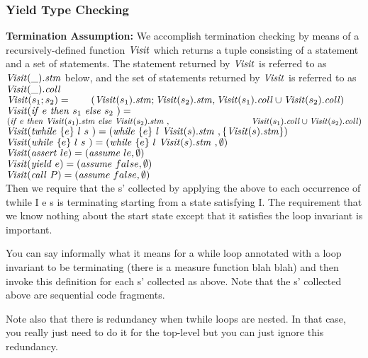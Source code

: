 \subsubsection{Yield Type Checking}

{\bf Termination Assumption:}
We accomplish termination checking by means of a recursively-defined function ${\mathit{Visit}}$ which returns a tuple consisting of a statement and a set of statements. The statement returned by ${\mathit{Visit}}$ is referred to as ${\mathit{Visit}}(\_).\mathit{stm}$ below, and the set of statements returned by ${\mathit{Visit}}$ is referred to as ${\mathit{Visit}}(\_).\mathit{coll}$
\\

\noindent
${\mathit{Visit}}(s_1; s_2) = \\ \hspace*{0.7cm} ({\mathit{Visit}}(s_1).\mathit{stm}; {\mathit{Visit}}(s_2).\mathit{stm}, {\mathit{Visit}}(s_1).\mathit{coll} \cup {\mathit{Visit}}(s_2).\mathit{coll})$\\
${\mathit{Visit}}({\mathit{if}\ {e}\ }{\mathit{then}\ {s_1}\ }{\mathit{else}\ { s_2}\ }) = $  \\
\hspace*{1.3cm}$( \ite{e}{\Visit(s_1).\stm}{\Visit(s_2).\stm}, \\
\hspace*{3.3cm}\Visit(s_1).\coll \cup \Visit(s_2).\coll)$\\
${\mathit{Visit}}(\mathit{twhile}\ \{{e}\}\ {{l}\ } {{s}\ }) = ( \mathit{while}\ \{{e}\}\ {{l}\ } {{{\mathit{Visit}}(s).\mathit{stm}}\ }, \{{\mathit{Visit}}(s).\mathit{stm}\} )$\\
${\mathit{Visit}}(\mathit{while}\ \{{e}\}\ {{l}\ } {{s}\ }) = ( \mathit{while}\ \{{e}\}\ {{l}\ } {{{\mathit{Visit}}(s).\mathit{stm}}\ }, \emptyset)$\\
${\mathit{Visit}}(\mathit{assert}\ le) = (\mathit{assume}\ le, \emptyset)$\\
${\mathit{Visit}}(\mathit{yield}\ e) = (\mathit{assume}\ false, \emptyset)$\\
${\mathit{Visit}}(\mathit{call}\ P) = (\mathit{assume}\ false, \emptyset)$\\


Then we require that the s' collected by applying the above to each occurrence of twhile {I} e s is terminating starting from a state satisfying I.  The requirement that we know nothing about the start state except that it satisfies the loop invariant is important.

You can say informally what it means for a while loop annotated with a loop invariant to be terminating (there is a measure function blah blah) and then invoke this definition for each s' collected as above.  Note that the s' collected above are sequential code fragments.  

Note also that there is redundancy when twhile loops are nested.  In that case, you really just need to do it for the top-level but you can just ignore this redundancy.



